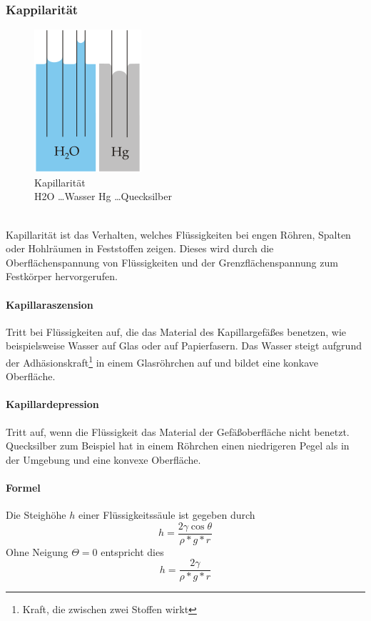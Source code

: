 \documentclass[a4paper,11pt]{article}
\begin{document}
\subsubsection{Kappilarität}
\begin{figure}[!ht]
\centering
\includegraphics[height=0.15\textheight]{capillarity.png}
\caption[https://de.wikipedia.org/wiki/Kapillarität]{Kapillarität \\ H2O \dots Wasser \quad Hg \dots Quecksilber}
\end{figure}
~\\
Kapillarität ist das Verhalten, welches Flüssigkeiten bei engen Röhren, Spalten oder Hohlräumen in Feststoffen zeigen.
Dieses wird durch die Oberflächenspannung von Flüssigkeiten und der Grenzflächenspannung zum Festkörper hervorgerufen.

\newpage

\paragraph{Kapillaraszension}
Tritt bei Flüssigkeiten auf, die das Material des Kapillargefäßes benetzen, wie beispielsweise Wasser auf Glas oder auf Papierfasern.
Das Wasser steigt aufgrund der Adhäsionskraft\footnote{Kraft, die zwischen zwei Stoffen wirkt} in einem Glasröhrchen auf und bildet eine konkave Oberfläche.

\paragraph{Kapillardepression}
Tritt auf, wenn die Flüssigkeit das Material der Gefäßoberfläche nicht benetzt.
Quecksilber zum Beispiel hat in einem Röhrchen einen niedrigeren Pegel als in der Umgebung und eine konvexe Oberfläche.

\paragraph{Formel}
Die Steighöhe $h$ einer Flüssigkeitssäule ist gegeben durch
$$h = \frac{2\gamma \cos{\theta}}{\rho * g * r}$$
Ohne Neigung $\Theta = 0$ entspricht dies
$$h = \frac{2\gamma}{\rho * g * r}$$
\end{document}
